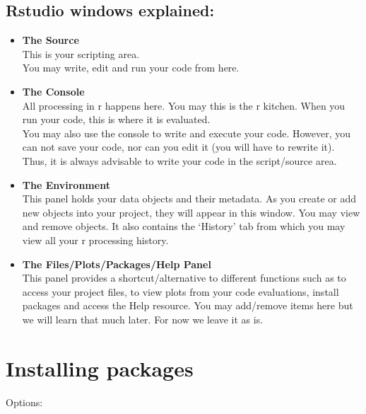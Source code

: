 \documentclass[
]{book}
\begin{document}
\hypertarget{rstudio-windows-explained}{%
\subsection{Rstudio windows explained:}\label{rstudio-windows-explained}}

\begin{itemize}
\item
  \textbf{The Source}\\
  This is your scripting area.\\
  You may write, edit and run your code from here.
\item
  \textbf{The Console}\\
  All processing in r happens here. You may this is the r kitchen.
  When you run your code, this is where it is evaluated.\\
  You may also use the console to write and execute your code. However, you can not save your code, nor can you edit it (you will have to rewrite it). Thus, it is always advisable to write your code in the script/source area.\\
\item
  \textbf{The Environment}\\
  This panel holds your data objects and their metadata. As you create or add new objects into your project, they will appear in this window. You may view and remove objects.
  It also contains the `History' tab from which you may view all your r processing history.\\
\item
  \textbf{The Files/Plots/Packages/Help Panel}\\
  This panel provides a shortcut/alternative to different functions such as to access your project files, to view plots from your code evaluations, install packages and access the Help resource. You may add/remove items here but we will learn that much later. For now we leave it as is.
\end{itemize}

\hypertarget{installing-packages}{%
\section{Installing packages}\label{installing-packages}}

Options:
\end{document}
